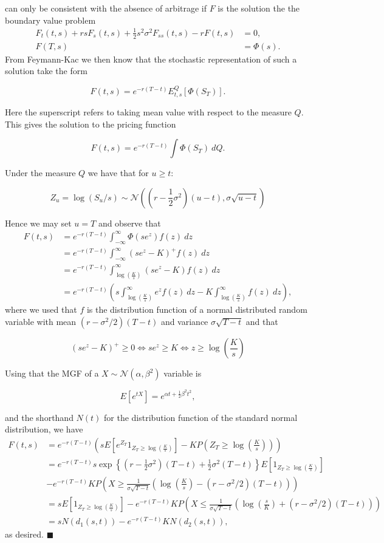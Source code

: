 \documentclass[a4paper,12pt,openany]{book}
\begin{document}
can only be consistent with the absence of arbitrage if \(F\) is the solution the the boundary value problem
\begin{align*}
F_t(t,s)+rsF_s(t,s)+\frac{1}{2}s^2\sigma^2F_{ss}(t,s)-rF(t,s)&=0,\\
F(T,s)&=\Phi(s).
\end{align*}
From Feymann-Kac we then know that the stochastic representation of such a solution take the form

\[
F(t,s)=e^{-r(T-t)}E_{t,s}^Q[\Phi(S_T)].
\]

Here the superscript refers to taking mean value with respect to the measure \(Q\). This gives the solution to the pricing function

\[
F(t,s)=e^{-r(T-t)}\int \Phi(S_T)\ dQ.
\]

Under the measure \(Q\) we have that for \(u\ge t\):

\[
Z_u=\log (S_u/s)\sim \mathcal{N}\left(\left(r-\frac{1}{2}\sigma^2\right)(u-t),\sigma\sqrt{u-t}\right)
\]

Hence we may set \(u=T\) and observe that
\begin{align*}
F(t,s)&=e^{-r(T-t)}\int_{-\infty}^\infty \Phi(se^z) f(z)\ dz\\
&=e^{-r(T-t)}\int_{-\infty}^\infty (se^z-K)^+ f(z)\ dz\\
&=e^{-r(T-t)}\int_{\log\left(\frac{K}{s}\right)}^{\infty} (se^z-K) f(z)\ dz\\
&=e^{-r(T-t)}\left(s\int_{\log\left(\frac{K}{s}\right)}^{\infty} e^z f(z)\ dz-K\int_{\log\left(\frac{K}{s}\right)}^{\infty} f(z)\ dz\right),
\end{align*}
where we used that \(f\) is the distribution function of a normal distributed random variable with mean \((r-\sigma^2/2)(T-t)\) and variance \(\sigma\sqrt{T-t}\) and that

\[
(se^z-K)^+ \ge 0\iff se^z\ge K\iff z\ge \log\left(\frac{K}{s}\right)
\]

Using that the MGF of a \(X\sim\mathcal{N}(\alpha, \beta^2)\) variable is

\[
E[e^{tX}]=e^{\alpha t+\frac{1}{2}\beta ^2t^2},
\]

and the shorthand \(N(t)\) for the distribution function of the standard normal distribution, we have
\begin{align*}
F(t,s)&=e^{-r(T-t)}\left(sE\left[e^{Z_T}1_{Z_T\ge \log\left(\frac{K}{s}\right)}\right]-K P\left(Z_T\ge \log\left(\frac{K}{s}\right)\right)\right)\\
&=e^{-r(T-t)}s\exp\left\{\left(r-\frac{1}{2}\sigma^2\right)(T-t)+\frac{1}{2}\sigma^2(T-t)\right\}E\left[1_{Z_T\ge \log\left(\frac{K}{s}\right)}\right]\\
&-e^{-r(T-t)}K P\left(X\ge\frac{1}{\sigma\sqrt{T-t}}\left( \log\left(\frac{K}{s}\right)-(r-\sigma^2/2)(T-t)\right)\right)\\
&=sE\left[1_{Z_T\ge \log\left(\frac{K}{s}\right)}\right]-e^{-r(T-t)}K P\left(X\le\frac{1}{\sigma\sqrt{T-t}}\left(\log\left(\frac{s}{K}\right)+(r-\sigma^2/2)(T-t)\right)\right)\\
&=sN(d_1(s,t))-e^{-r(T-t)}K N\left(d_2(s,t)\right),
\end{align*}
as desired. \(\blacksquare\)
\end{document}
